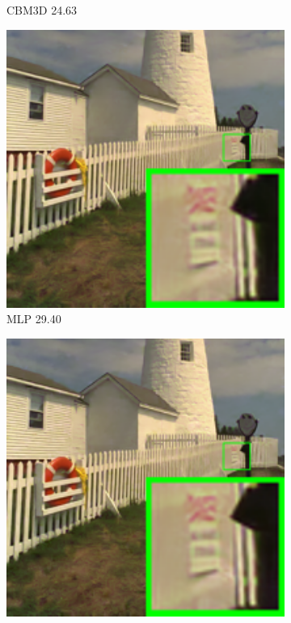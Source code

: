\begin{figure}
\begin{subfigure}[t]{0.19\textwidth}
		\caption{CBM3D 24.63}
    \end{subfigure}
    \hfill
    \begin{subfigure}[t]{0.19\textwidth}
        \centering
        \includegraphics[width=1\textwidth]{images/mcwnnm/24images/resize_br_MLP_nSig301050_kodim19.png}
\caption{MLP 29.40}
    \end{subfigure}
    \hfill
    \begin{subfigure}[t]{0.19\textwidth}
        \centering
        \includegraphics[width=1\textwidth]{images/mcwnnm/24images/resize_br_TNRD_nSig301050_kodim19.png}

\end{subfigure}
\end{figure}
